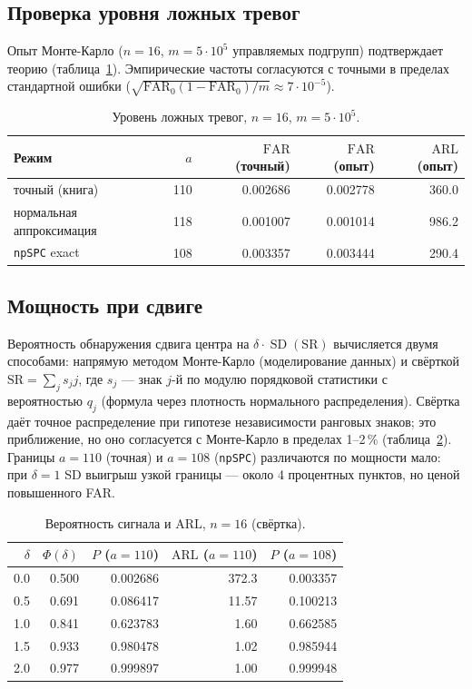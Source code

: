 \documentclass[11pt,a4paper]{article}
\newcommand{\SR}{\mathrm{SR}}
\newcommand{\FAR}{\mathrm{FAR}}
\newcommand{\ARL}{\mathrm{ARL}}
\newcommand{\FARz}{\mathrm{FAR}_0}
\newcommand{\SD}{\operatorname{SD}}
\begin{document}
\subsection{Проверка уровня ложных тревог}
\label{sec:far}

Опыт Монте-Карло ($n=16$, $m=5\cdot10^5$ управляемых подгрупп)
подтверждает теорию (таблица~\ref{tab:far}). Эмпирические частоты
согласуются с точными в пределах стандартной ошибки
($\sqrt{\FARz(1-\FARz)/m}\approx7\cdot10^{-5}$).

\begin{table}[htbp]\centering
\caption{Уровень ложных тревог, $n=16$, $m=5\cdot10^5$.}
\label{tab:far}
\small
\begin{tabular}{@{}l r r r r@{}}
\toprule
Режим & $a$ & $\FAR$ (точный) & $\FAR$ (опыт) & $\ARL$ (опыт) \\
\midrule
точный (книга) & 110 & 0.002686 & 0.002778 & 360.0 \\
нормальная аппроксимация & 118 & 0.001007 & 0.001014 & 986.2 \\
\texttt{npSPC} exact & 108 & 0.003357 & 0.003444 & 290.4 \\
\bottomrule
\end{tabular}
\normalsize
\end{table}

\subsection{Мощность при сдвиге}
\label{sec:power}

Вероятность обнаружения сдвига центра на $\delta\cdot\SD(\SR)$ вычисляется
двумя способами: напрямую методом Монте-Карло (моделирование данных) и
свёрткой $\SR=\sum_j s_j j$, где $s_j$ --- знак $j$-й по модулю порядковой
статистики с вероятностью $q_j$ (формула через плотность нормального
распределения). Свёртка даёт точное распределение при гипотезе
независимости ранговых знаков; это приближение, но оно согласуется с
Монте-Карло в пределах 1--2\,\% (таблица~\ref{tab:power}). Границы
$a=110$ (точная) и $a=108$ (\texttt{npSPC}) различаются по мощности
мало: при $\delta=1$ SD выигрыш узкой границы --- около 4 процентных
пунктов, но ценой повышенного FAR.

\begin{table}[htbp]\centering
\caption{Вероятность сигнала и $\ARL$, $n=16$ (свёртка).}
\label{tab:power}
\small
\begin{tabular}{@{}r r r r r@{}}
\toprule
$\delta$ & $\Phi(\delta)$ & $P$ ($a=110$) & $\ARL$ ($a=110$)
& $P$ ($a=108$) \\
\midrule
0.0 & 0.500 & 0.002686 & 372.3 & 0.003357 \\
0.5 & 0.691 & 0.086417 & 11.57 & 0.100213 \\
1.0 & 0.841 & 0.623783 & 1.60 & 0.662585 \\
1.5 & 0.933 & 0.980478 & 1.02 & 0.985944 \\
2.0 & 0.977 & 0.999897 & 1.00 & 0.999948 \\
\bottomrule
\end{tabular}
\normalsize
\end{table}
\end{document}
